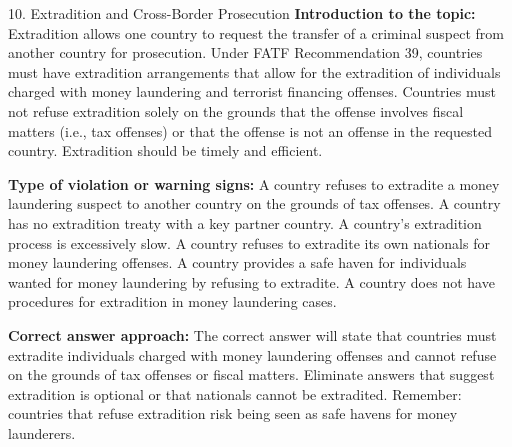 \documentclass[11pt,a4paper]{beamer}
\begin{document}
\begin{frame}{10. Extradition and Cross-Border Prosecution}
\tiny
\noindent\textbf{Introduction to the topic:} Extradition allows one country to request the transfer of a criminal suspect from another country for prosecution. Under FATF Recommendation 39, countries must have extradition arrangements that allow for the extradition of individuals charged with money laundering and terrorist financing offenses. Countries must not refuse extradition solely on the grounds that the offense involves fiscal matters (i.e., tax offenses) or that the offense is not an offense in the requested country. Extradition should be timely and efficient.

\vspace{0.1cm}
\noindent\textbf{Type of violation or warning signs:} A country refuses to extradite a money laundering suspect to another country on the grounds of tax offenses. A country has no extradition treaty with a key partner country. A country's extradition process is excessively slow. A country refuses to extradite its own nationals for money laundering offenses. A country provides a safe haven for individuals wanted for money laundering by refusing to extradite. A country does not have procedures for extradition in money laundering cases.

\vspace{0.1cm}
\noindent\textbf{Correct answer approach:} The correct answer will state that countries must extradite individuals charged with money laundering offenses and cannot refuse on the grounds of tax offenses or fiscal matters. Eliminate answers that suggest extradition is optional or that nationals cannot be extradited. Remember: countries that refuse extradition risk being seen as safe havens for money launderers.
\end{frame}
\end{document}
